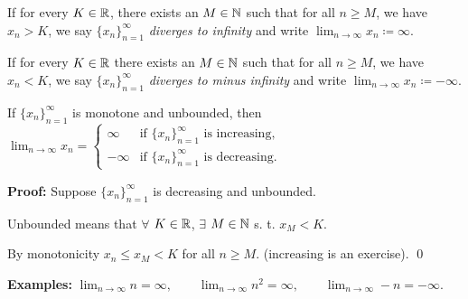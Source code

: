 \documentclass[10pt,aspectratio=169]{beamer}
\begin{document}
\begin{frame}

\begin{definition}
If for every $K \in {\mathbb{R}}$, there exists an $M \in {\mathbb{N}}$ such that
for all $n \geq M$, we have $x_n > K$,
we say $\{ x_n \}_{n=1}^\infty$ \emph{diverges to infinity} and write
\quad
$\displaystyle \lim_{n \to \infty} x_n \coloneqq \infty$.

\pause
\medskip

If for every $K \in {\mathbb{R}}$ there exists an $M \in {\mathbb{N}}$ such that
for all $n \geq M$, we have $x_n < K$,
we say $\{ x_n \}_{n=1}^\infty$ \emph{diverges to minus infinity} and write
\quad
$\displaystyle \lim_{n \to \infty} x_n \coloneqq -\infty$.
\end{definition}


\pause

\begin{proposition}
If $\{ x_n \}_{n=1}^\infty$ is monotone and unbounded, then
$\displaystyle
\lim_{n \to \infty} x_n =
\begin{cases}
\infty  & \text{if } \{ x_n \}_{n=1}^\infty \text{ is increasing,} \\
-\infty & \text{if } \{ x_n \}_{n=1}^\infty \text{ is decreasing.}
\end{cases}
$
\end{proposition}

\pause
\textbf{Proof:}
Suppose $\{x_n\}_{n=1}^\infty$ is decreasing and unbounded.

\pause
Unbounded means that $\forall$ $K \in {\mathbb{R}}$, $\exists$ $M \in {\mathbb{N}}$ s. t. $x_M < K$.

\pause
By monotonicity $x_n \leq x_M < K$ for all $n \geq M$.
\pause \quad (increasing is an exercise).
\qed

\pause
\medskip

\textbf{Examples:}
$\displaystyle \lim_{n\to \infty} n = \infty,
\qquad
\lim_{n\to \infty} n^2 = \infty,
\qquad
\lim_{n\to \infty} -n = -\infty$.
\end{frame}
\end{document}
